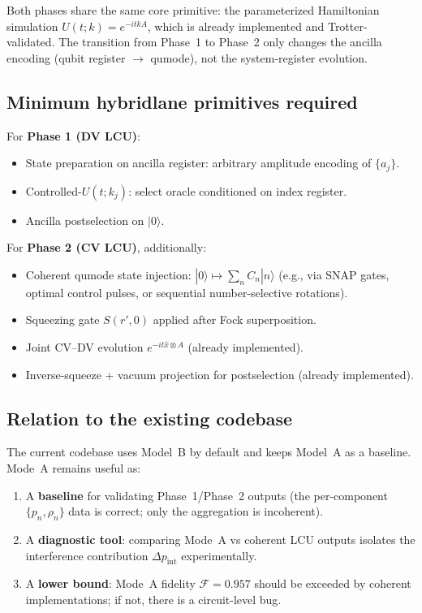 \documentclass[11pt]{article}
\begin{document}
Both phases share the same core primitive: the parameterized Hamiltonian simulation
$U(t;k) = e^{-itkA}$, which is already implemented and Trotter-validated.
The transition from Phase~1 to Phase~2 only changes the ancilla encoding
(qubit register $\to$ qumode), not the system-register evolution.

\subsection{Minimum hybridlane primitives required}

For \textbf{Phase 1 (DV LCU)}:
\begin{itemize}[itemsep=2pt,topsep=2pt]
\item State preparation on ancilla register: arbitrary amplitude encoding of $\{a_j\}$.
\item Controlled-$U(t;k_j)$: select oracle conditioned on index register.
\item Ancilla postselection on $|0\rangle$.
\end{itemize}

For \textbf{Phase 2 (CV LCU)}, additionally:
\begin{itemize}[itemsep=2pt,topsep=2pt]
\item Coherent qumode state injection: $|0\rangle \mapsto \sum_n C_n |n\rangle$ (e.g., via
      SNAP gates, optimal control pulses, or sequential number-selective rotations).
\item Squeezing gate $S(r',0)$ applied after Fock superposition.
\item Joint CV--DV evolution $e^{-it\hat{x}\otimes A}$ (already implemented).
\item Inverse-squeeze + vacuum projection for postselection (already implemented).
\end{itemize}

\subsection{Relation to the existing codebase}

The current codebase uses Model~B by default and keeps Model~A as a baseline.
Mode~A remains useful as:
\begin{enumerate}[itemsep=2pt,topsep=2pt]
\item A \textbf{baseline} for validating Phase~1/Phase~2 outputs (the per-component
      $\{p_n, \rho_n\}$ data is correct; only the aggregation is incoherent).
\item A \textbf{diagnostic tool}: comparing Mode~A vs coherent LCU outputs isolates
      the interference contribution $\Delta p_{\mathrm{int}}$ experimentally.
\item A \textbf{lower bound}: Mode~A fidelity $\mathcal{F}=0.957$ should be exceeded
      by coherent implementations; if not, there is a circuit-level bug.
\end{enumerate}
\end{document}
